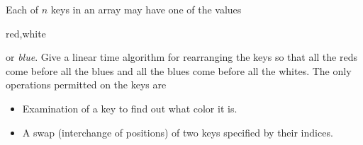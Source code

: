 Each of $n$ keys in an array may have one of the values {\it

red,white} or {\it blue}. Give a linear time algorithm for rearranging
the keys so that all the reds come before all the blues and all the
blues come before all the whites. The only operations permitted on the
keys are 
\begin{itemize}
\item  Examination of a key to find out what color it is.
\item  A swap (interchange of positions) of two keys specified by
their indices.
\end{itemize}


